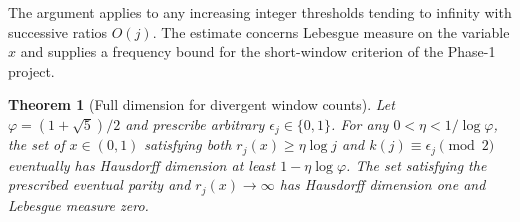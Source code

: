 \documentclass[11pt]{article}
\newtheorem{theorem}{Theorem}
\theoremstyle{definition}
\theoremstyle{remark}
\begin{document}
The argument applies to any increasing integer thresholds tending to
infinity with successive ratios $O(j)$. The estimate concerns
Lebesgue measure on the variable $x$ and supplies a frequency bound
for the short-window criterion of the Phase-1 project.

\begin{theorem}[Full dimension for divergent window counts]\label{thm:no-short-dim}
Let $\varphi=(1+\sqrt5)/2$ and prescribe arbitrary
$\epsilon_j\in\{0,1\}$. For any $0<\eta<1/\log\varphi$, the set of
$x\in(0,1)$ satisfying both $r_j(x)\ge\eta\log j$ and
$k(j)\equiv\epsilon_j\pmod2$ eventually has Hausdorff dimension at
least $1-\eta\log\varphi$. The set satisfying the prescribed
eventual parity and $r_j(x)\to\infty$ has Hausdorff dimension one
and Lebesgue measure zero.
\end{theorem}
\end{document}
